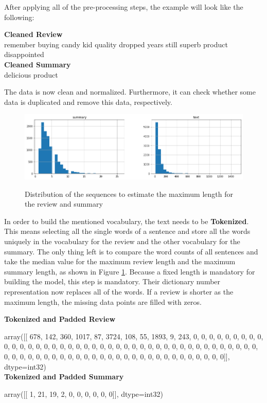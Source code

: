 After applying all of the pre-processing steps, the example will look like the following:

\begin{tcolorbox}
	\textbf{Cleaned Review} \\
	remember buying candy kid quality dropped years still superb product disappointed \\
	
	\textbf{Cleaned Summary} \\
	delicious product
\end{tcolorbox}

The data is now clean and normalized. Furthermore, it can check whether some data is duplicated and remove this data, respectively. 

\begin{figure}
	\begin{center}
		\includegraphics[width=6in]{photos/dist_seq}\\
		\caption{Distribution of the sequences to estimate the maximum length for the review and summary}\label{dist_seq}
	\end{center}
\end{figure}

In order to build the mentioned vocabulary, the text needs to be \textbf{Tokenized}. This means selecting all the single words of a sentence and store all the words uniquely in the vocabulary for the review and the other vocabulary for the summary. The only thing left is to compare the word counts of all sentences and take the median value for the maximum review length and the maximum summary length, as shown in Figure \ref{dist_seq}. Because a fixed length is mandatory for building the model, this step is mandatory. Their dictionary number representation now replaces all of the words. If a review is shorter as the maximum length, the missing data points are filled with zeros.

\begin{tcolorbox}
	\textbf{Tokenized and Padded Review}
	
	array([[ 678,  142,  360, 1017,   87, 3724,  108,   55, 1893,    9,  243,
	0,    0,    0,    0,    0,    0,    0,    0,    0,    0,    0,
	0,    0,    0,    0,    0,    0,    0,    0,    0,    0,    0,
	0,    0,    0,    0,    0,    0,    0,    0,    0,    0,    0,
	0,    0,    0,    0,    0,    0,    0,    0,    0,    0,    0,
	0,    0,    0,    0,    0,    0,    0,    0,    0,    0,    0,
	0,    0,    0,    0,    0,    0,    0,    0,    0,    0,    0,
	0,    0,    0]], dtype=int32) \\
	
	\textbf{Tokenized and Padded Summary}
	
	array([[ 1, 21, 19,  2,  0,  0,  0,  0,  0,  0]], dtype=int32)
\end{tcolorbox}

